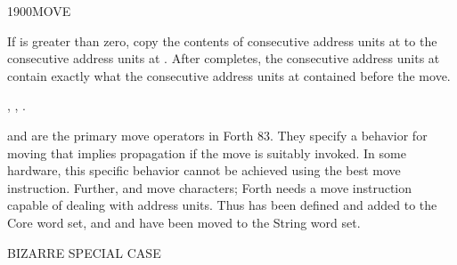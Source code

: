\begin{worddef}{1900}{MOVE}
\item {}

	If  is greater than zero, copy the contents of 
	consecutive address units at  to the 
	consecutive address units at . After 
	completes, the  consecutive address units at 
	contain exactly what the  consecutive address units at
	 contained before the move.

\see	{},
	,
	.

	\begin{rationale} %
		 and  are the primary
		move operators in Forth 83. They specify a behavior for moving
		that implies propagation if the move is suitably invoked. In
		some hardware, this specific behavior cannot be achieved using
		the best move instruction. Further,  and
		 move characters; Forth needs a move
		instruction capable of dealing with address units. Thus
		 has been defined and added to the Core word set,
		and  and  have been
		moved to the String word set.
	\end{rationale}

	\begin{testing} %
		 \hfill {} BIZARRE SPECIAL CASE \\

		 \\

		 \\

		 \\

		 \\

		 \\
	\end{testing}
\end{worddef}

